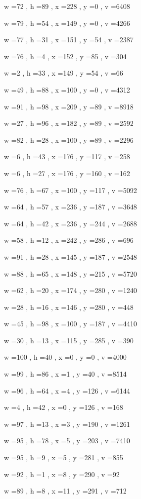 \documentclass[11pt]{article}
\begin{document}
w =72 , h =89 , x =228 , y =0 , v =6408
\par
w =79 , h =54 , x =149 , y =0 , v =4266
\par
w =77 , h =31 , x =151 , y =54 , v =2387
\par
w =76 , h =4 , x =152 , y =85 , v =304
\par
w =2 , h =33 , x =149 , y =54 , v =66
\par
w =49 , h =88 , x =100 , y =0 , v =4312
\par
w =91 , h =98 , x =209 , y =89 , v =8918
\par
w =27 , h =96 , x =182 , y =89 , v =2592
\par
w =82 , h =28 , x =100 , y =89 , v =2296
\par
w =6 , h =43 , x =176 , y =117 , v =258
\par
w =6 , h =27 , x =176 , y =160 , v =162
\par
w =76 , h =67 , x =100 , y =117 , v =5092
\par
w =64 , h =57 , x =236 , y =187 , v =3648
\par
w =64 , h =42 , x =236 , y =244 , v =2688
\par
w =58 , h =12 , x =242 , y =286 , v =696
\par
w =91 , h =28 , x =145 , y =187 , v =2548
\par
w =88 , h =65 , x =148 , y =215 , v =5720
\par
w =62 , h =20 , x =174 , y =280 , v =1240
\par
w =28 , h =16 , x =146 , y =280 , v =448
\par
w =45 , h =98 , x =100 , y =187 , v =4410
\par
w =30 , h =13 , x =115 , y =285 , v =390
\par
w =100 , h =40 , x =0 , y =0 , v =4000
\par
w =99 , h =86 , x =1 , y =40 , v =8514
\par
w =96 , h =64 , x =4 , y =126 , v =6144
\par
w =4 , h =42 , x =0 , y =126 , v =168
\par
w =97 , h =13 , x =3 , y =190 , v =1261
\par
w =95 , h =78 , x =5 , y =203 , v =7410
\par
w =95 , h =9 , x =5 , y =281 , v =855
\par
w =92 , h =1 , x =8 , y =290 , v =92
\par
w =89 , h =8 , x =11 , y =291 , v =712
\par
\newpage
\end{document}
